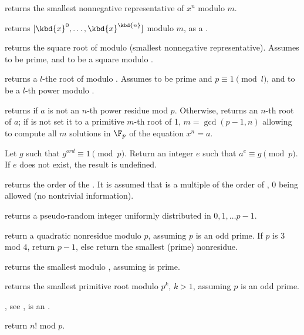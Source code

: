  returns the smallest
nonnegative representative of $x^n$ modulo $m$.

 returns
$[\kbd{x}^0, \dots, \kbd{x}^\kbd{n}]$ modulo $m$, as a .

 returns the square root of 
modulo  (smallest nonnegative representative). Assumes  to be
prime, and  to be a square modulo .

 returns a $l$-the root of 
modulo . Assumes  to be prime and $p \equiv 1 \pmod{l}$, and
 to be a $l$-th power modulo .

returns  if $a$ is not an $n$-th power residue mod $p$.
Otherwise, returns an $n$-th root of $a$; if  is not 
set it to a primitive $m$-th root of 1, $m = \gcd(p-1,n)$ allowing to compute
all $m$ solutions in $\F_p$ of the equation $x^n = a$.

 Let $g$ such that
$g^{ord} \equiv 1 \pmod{p}$. Return an integer $e$ such that
$a^e \equiv g \pmod{p}$. If $e$ does not exist, the result is undefined.

 returns the order of the
 . It is assumed that  is a multiple of the order of
, $0$ being allowed (no nontrivial information).

 returns a pseudo-random integer uniformly
distributed in $0, 1, \dots p-1$.

 return a quadratic nonresidue modulo $p$,
assuming $p$ is an odd prime. If $p$ is $3$ mod $4$, return $p-1$, else
return the smallest (prime) nonresidue.

 returns the smallest 
modulo , assuming  is prime.

 returns the smallest primitive root modulo
$p^k$, $k > 1$, assuming $p$ is an odd prime.

, see ,
 is an .

 return $n!$ mod $p$.

